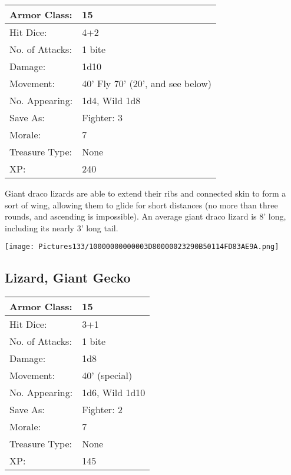 \documentclass[a4paper,twoside,openany,10pt]{book}
\begin{document}
\begin{multicols}{2}
\begin{tabularx}{0.50\textwidth}{@{}lX@{}}
Armor Class: & 15 \\\hline
Hit Dice: & 4+2 \\\hline
No. of Attacks: & 1 bite \\\hline
Damage: & 1d10 \\\hline
Movement: & 40' Fly 70'
(20', and see below) \\\hline
No. Appearing: & 1d4, Wild 1d8 \\\hline
Save As: & Fighter: 3 \\\hline
Morale: & 7 \\\hline
Treasure Type: & None \\\hline
XP: & 240 \\\hline
\end{tabularx}\medskip

Giant draco lizards are able to extend their ribs and connected skin to
form a sort of wing, allowing them to glide for short distances (no more
than three rounds, and ascending is impossible). An average giant draco
lizard is 8' long, including its nearly
3' long tail.

\begin{center} \texttt{[image: Pictures133/10000000000003D80000023290B50114FD83AE9A.png]} \end{center}


\subsection*{Lizard, Giant Gecko}\label{lizard-giant-gecko}

\begin{tabularx}{0.50\textwidth}{@{}lX@{}}
Armor Class: & 15 \\\hline
Hit Dice: & 3+1 \\\hline
No. of Attacks: & 1 bite \\\hline
Damage: & 1d8 \\\hline
Movement: & 40' (special) \\\hline
No. Appearing: & 1d6, Wild 1d10 \\\hline
Save As: & Fighter: 2 \\\hline
Morale: & 7 \\\hline
Treasure Type: & None \\\hline
XP: & 145 \\\hline
\end{tabularx}\medskip


\end{multicols}
\end{document}
